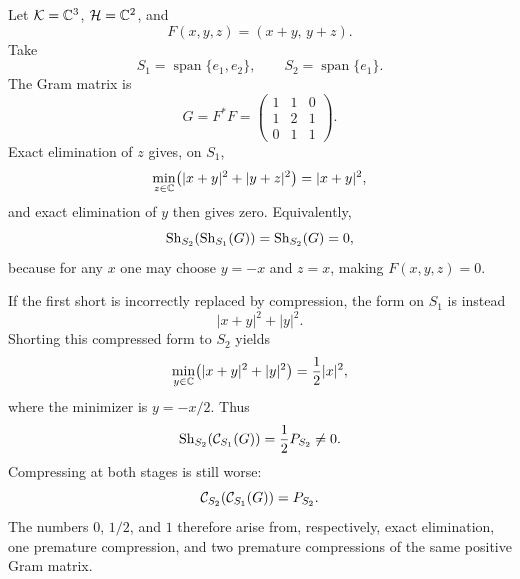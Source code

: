 \begin{example}
\label{ex:tpc62-nested-compression-failure}
Let \(\mathcal K=\mathbb C^3\), \(\mathcal H=\mathbb C^2\), and
\begin{equation}
 F(x,y,z)=(x+y,\,y+z).
 \label{eq:tpc62-compression-counterexample-map}
\end{equation}
Take
\begin{equation}
 S_1=\operatorname{span}\{e_1,e_2\},
 \qquad S_2=\operatorname{span}\{e_1\}.
 \label{eq:tpc62-compression-counterexample-spaces}
\end{equation}
The Gram matrix is
\begin{equation}
 G=F^*F=
 \begin{pmatrix}
 1&1&0\\
 1&2&1\\
 0&1&1
 \end{pmatrix}.
 \label{eq:tpc62-compression-counterexample-Gram}
\end{equation}
Exact elimination of \(z\) gives, on \(S_1\),
\begin{equation}
 \min_{z\in\mathbb C}\bigl(|x+y|^2+|y+z|^2\bigr)
 =|x+y|^2,
 \label{eq:tpc62-compression-counterexample-first-short}
\end{equation}
and exact elimination of \(y\) then gives zero.  Equivalently,
\begin{equation}
 \operatorname{Sh}_{S_2}(\operatorname{Sh}_{S_1}(G))
 =\operatorname{Sh}_{S_2}(G)=0,
 \label{eq:tpc62-compression-counterexample-exact-zero}
\end{equation}
because for any \(x\) one may choose \(y=-x\) and \(z=x\), making
\(F(x,y,z)=0\).

If the first short is incorrectly replaced by compression, the form on
\(S_1\) is instead
\begin{equation}
 |x+y|^2+|y|^2.
 \label{eq:tpc62-compression-counterexample-compressed-form}
\end{equation}
Shorting this compressed form to \(S_2\) yields
\begin{equation}
 \min_{y\in\mathbb C}\bigl(|x+y|^2+|y|^2\bigr)
 =\frac12|x|^2,
 \label{eq:tpc62-compression-counterexample-false-half}
\end{equation}
where the minimizer is \(y=-x/2\).  Thus
\begin{equation}
 \operatorname{Sh}_{S_2}(\mathcal C_{S_1}(G))=\frac12 P_{S_2}\ne0.
 \label{eq:tpc62-compression-counterexample-operator-half}
\end{equation}
Compressing at both stages is still worse:
\begin{equation}
 \mathcal C_{S_2}(\mathcal C_{S_1}(G))=P_{S_2}.
 \label{eq:tpc62-compression-counterexample-operator-one}
\end{equation}
The numbers \(0\), \(1/2\), and \(1\) therefore arise from, respectively,
exact elimination, one premature compression, and two premature
compressions of the same positive Gram matrix.
\end{example}

